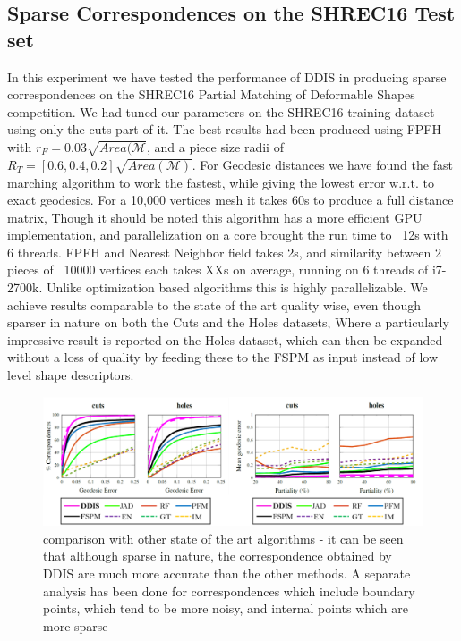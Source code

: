 \documentclass[10pt,twocolumn,letterpaper]{article}
\begin{document}
\subsection{Sparse Correspondences on the SHREC16 Test set}
In this experiment we have tested the performance of DDIS in producing sparse correspondences on the SHREC16 Partial Matching of Deformable Shapes competition. 
We had tuned our parameters on the SHREC16 training dataset using only the cuts part of it. The best results had been produced using FPFH with $r_F = 0.03\sqrt{Area(\mathcal{M}}$, and a piece size radii of $R_T=[0.6,0.4,0.2]\sqrt{Area(\mathcal{M})}$. For Geodesic distances we have found the fast marching algorithm to work the fastest, while giving the lowest error w.r.t. to exact geodesics. For a 10,000 vertices mesh it takes 60s to produce a full distance matrix, Though it should be noted this algorithm has a more efficient GPU implementation, and parallelization on a core brought the run time to ~12s with 6 threads. FPFH and Nearest Neighbor field takes 2s, and similarity between 2 pieces of ~10000 vertices each takes XXs on average, running on 6 threads of i7-2700k. Unlike optimization based algorithms this is highly parallelizable.
We achieve results comparable to the state of the art \cite{litany2017fully} quality wise, even though sparser in nature on both the Cuts and the Holes datasets, Where a particularly impressive result is reported on the Holes dataset, which can then be expanded without a loss of quality by feeding these to the FSPM\cite{litany2017fully} as input instead of low level shape descriptors.

\begin{figure}[htb]
	\centering

	\includegraphics[width=1\textwidth]{figures/ROCSHREC16.png}
	\caption{comparison with other state of the art algorithms - it can be seen that although sparse in nature, the correspondence obtained by DDIS are much more accurate than the other methods. 
		A separate analysis has been done for correspondences which include boundary points, which tend to be more noisy, and internal points which are more sparse}
\end{figure}
\end{document}
